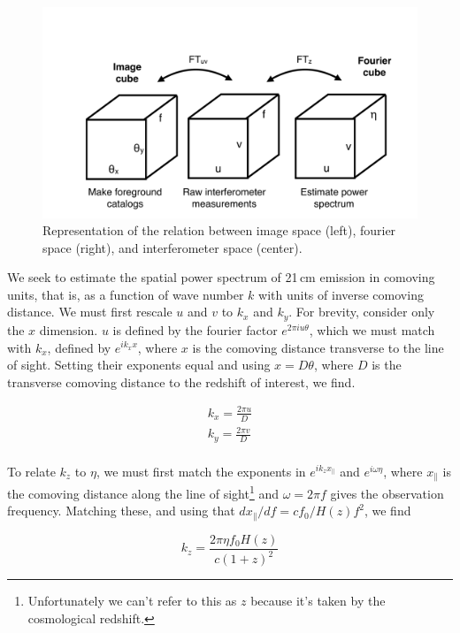 {\begin{figure}[h]
    \centering
    \includegraphics[width=1\textwidth]{chap0_intro/ifo_space.pdf}
    \caption{Representation of the relation between image space (left), fourier space (right), and interferometer space (center).}
    \label{fig:ifospace}
\end{figure}

We seek to estimate the spatial power spectrum of 21\,cm emission in comoving units, that is, as a function of wave number $k$ with units of inverse comoving distance. We must first rescale $u$ and $v$ to $k_x$ and $k_y$. For brevity, consider only the $x$ dimension. $u$ is defined by the fourier factor $e^{2\pi i u\theta}$, which we must match with $k_x$, defined by $e^{ik_x x}$, where $x$ is the comoving distance transverse to the line of sight. Setting their exponents equal and using $x=D\theta$, where $D$ is the transverse comoving distance to the redshift of interest, we find.

\begin{eqnarray}
	k_x=\frac{2\pi u}{D} \\ 
	k_y=\frac{2\pi v}{D} \\ 
\end{eqnarray}

To relate $k_z$ to $\eta$, we must first match the exponents in $e^{i k_z x_\parallel}$ and $e^{i\omega \eta}$, where $x_\parallel$ is the comoving distance along the line of sight\footnote{Unfortunately we can't refer to this as $z$ because it's taken by the cosmological redshift.} and $\omega=2\pi f$ gives the observation frequency. Matching these, and using that $d x_\parallel/df=cf_0/H(z)f^2$, we find

\begin{equation}
	k_z=\frac{2\pi\eta f_0 H(z)}{c(1+z)^2}
\end{equation}

}
